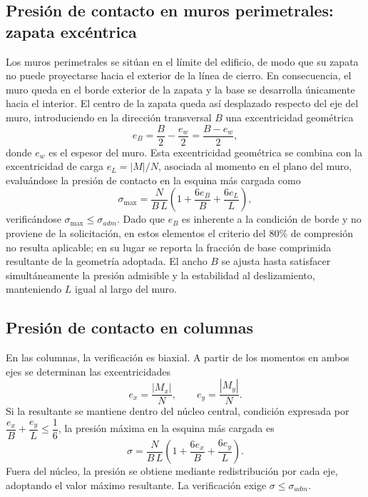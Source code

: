 \subsection{Presión de contacto en muros perimetrales: zapata excéntrica}
\label{subsec:zapata_excentrica}
Los muros perimetrales se sitúan en el límite del edificio, de modo que su zapata no puede proyectarse hacia el exterior de la línea de cierro. En consecuencia, el muro queda en el borde exterior de la zapata y la base se desarrolla únicamente hacia el interior. El centro de la zapata queda así desplazado respecto del eje del muro, introduciendo en la dirección transversal $B$ una excentricidad geométrica
\begin{equation}
e_B = \frac{B}{2} - \frac{e_w}{2} = \frac{B - e_w}{2},
\end{equation}
donde $e_w$ es el espesor del muro. Esta excentricidad geométrica se combina con la excentricidad de carga $e_L = |M|/N$, asociada al momento en el plano del muro, evaluándose la presión de contacto en la esquina más cargada como
\begin{equation}
\sigma_{\max} = \frac{N}{B\,L}\left( 1 + \frac{6 e_B}{B} + \frac{6 e_L}{L} \right),
\end{equation}
verificándose $\sigma_{\max} \le \sigma_{adm}$. Dado que $e_B$ es inherente a la condición de borde y no proviene de la solicitación, en estos elementos el criterio del 80\% de compresión no resulta aplicable; en su lugar se reporta la fracción de base comprimida resultante de la geometría adoptada. El ancho $B$ se ajusta hasta satisfacer simultáneamente la presión admisible y la estabilidad al deslizamiento, manteniendo $L$ igual al largo del muro.

\subsection{Presión de contacto en columnas}
En las columnas, la verificación es biaxial. A partir de los momentos en ambos ejes se determinan las excentricidades
\begin{equation}
e_x = \frac{|M_x|}{N}, \qquad e_y = \frac{|M_y|}{N}.
\end{equation}
Si la resultante se mantiene dentro del núcleo central, condición expresada por $\dfrac{e_x}{B} + \dfrac{e_y}{L} \le \dfrac{1}{6}$, la presión máxima en la esquina más cargada es
\begin{equation}
\sigma = \frac{N}{B\,L}\left( 1 + \frac{6 e_x}{B} + \frac{6 e_y}{L} \right).
\end{equation}
Fuera del núcleo, la presión se obtiene mediante redistribución por cada eje, adoptando el valor máximo resultante. La verificación exige $\sigma \le \sigma_{adm}$.

